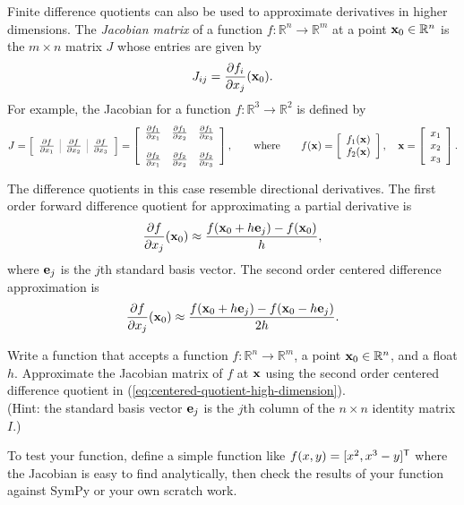 Finite difference quotients can also be used to approximate derivatives in higher dimensions.
The \emph{Jacobian matrix} of a function $f:\mathbb{R}^n \rightarrow \mathbb{R}^m$ at a point $\mathbf{x}_0 \in \mathbb{R}^n$ is the $m \times n$ matrix $J$ whose entries are given by
\begin{equation*}
J_{ij} = \frac{\partial f_i}{\partial x_j}(\mathbf{x}_0).
\end{equation*}
For example, the Jacobian for a function $f:\mathbb{R}^3 \rightarrow \mathbb{R}^2$ is defined by
\[
J = \left[\begin{array}{c|c|c}
\arrayrulecolor{gray}
\frac{\partial f}{\partial x_1}&\frac{\partial f}{\partial x_2}&\frac{\partial f}{\partial x_3}
\end{array}\right]
=
\left[\begin{array}{ccc}
\frac{\partial f_1}{\partial x_1}&\frac{\partial f_1}{\partial x_2}&\frac{\partial f_1}{\partial x_3}
\\ \\
\frac{\partial f_2}{\partial x_1}&\frac{\partial f_2}{\partial x_2}&\frac{\partial f_2}{\partial x_3}
\end{array}\right],
\qquad
\text{where}
\qquad
f(\x) =
\left[\begin{array}{c}
f_1(\x) \\ f_2(\x)
\end{array}\right],
\quad
\x = \left[\begin{array}{c}
x_1 \\ x_2 \\ x_3
\end{array}\right].
\]

The difference quotients in this case resemble directional derivatives.
The first order forward difference quotient for approximating a partial derivative is
\[
\frac{\partial f}{\partial x_j}(\mathbf{x}_0) \approx \frac{f(\mathbf{x}_0 + h\mathbf{e}_j) - f(\mathbf{x}_0)}{h},
\]
where $\mathbf{e}_j$ is the $j$th standard basis vector.
The second order centered difference approximation is
\begin{equation}
\frac{\partial f}{\partial x_j}(\mathbf{x}_0) \approx \frac{f(\mathbf{x}_0 + h\mathbf{e}_j) - f(\mathbf{x}_0 - h\mathbf{e}_j)}{2h}.
\label{eq:centered-quotient-high-dimension}
\end{equation}

\begin{problem}
Write a function that accepts a function $f:\mathbb{R}^n\rightarrow\mathbb{R}^m$, a point $\mathbf{x}_0 \in \mathbb{R}^n$, and a float $h$.
Approximate the Jacobian matrix of $f$ at $\mathbf{x}$ using the second order centered difference quotient in (\ref{eq:centered-quotient-high-dimension}).
\\(Hint: the standard basis vector $\mathbf{e}_j$ is the $j$th column of the $n\times n$ identity matrix $I$.)

To test your function, define a simple function like $f(x,y) = [x^2, x^3 - y]^{\mathsf T}$ where the Jacobian is easy to find analytically, then check the results of your function against SymPy or your own scratch work.
\label{prob:jac_center}
\end{problem}

